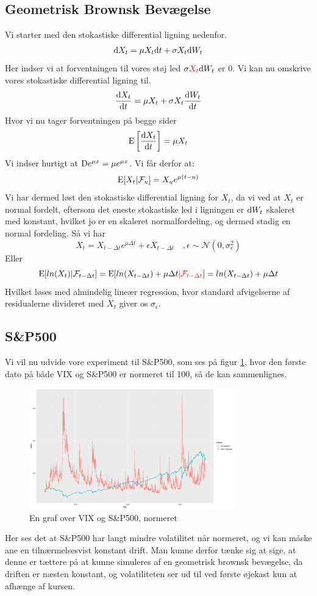 \documentclass{article}
\theoremstyle{definition}
\theoremstyle{remark}
\begin{document}
\subsection{Geometrisk Brownsk Bevægelse}
Vi starter med den stokastiske differential ligning nedenfor.
$$\text d X_t =  \mu X_t\text dt+\sigma X_t \text dW_t$$
Her indser vi at forventningen til vores støj led $\sigma \color{red}X_t\color{black}\text d W_t$ er 0. Vi kan nu omskrive vores stokastiske differential ligning til.
$$\frac{\text d X_t}{\text dt} =  \mu X_t+\sigma X_t \frac{\text dW_t}{\text dt}$$
Hvor vi nu tager forventningen på begge sider
$$\text E\left[\frac{\text d X_t}{\text dt}\right] =  \mu X_t$$
Vi indser hurtigt at $\text De^{\mu x}=\mu e^{\mu x}$. Vi får derfor at:
$$\text E[X_t|\mathcal F_u]=X_ue^{\mu (t-u)}$$
Vi har dermed løst den stokastiske differential ligning for $X_t$, da vi ved at $X_t$ er normal fordelt, eftersom det eneste stokastiske led i ligningen er $\text d W_t$ skaleret med konstant, hvilket jo er en skaleret normalfordeling, og dermed stadig en normal fordeling. Så vi har
$$X_t = X_{t-\Delta t}e^{\mu \Delta t}+\epsilon X_{t-\Delta t}\quad,\epsilon\sim\mathcal N(0,\sigma_\epsilon^2)$$
Eller
$$\text E[ln(X_t)|\mathcal F_{t-\Delta t}]=\text E[ln(X_{t-\Delta t})+\mu \Delta t\color{red}|\mathcal F_{t-\Delta t}\color{black}]=ln(X_{t-\Delta t})+\mu \Delta t $$
Hvilket løses med almindelig lineær regression, hvor standard afvigelserne af residualerne divideret med $X_t$ giver os $\sigma_\epsilon$.
\subsection{S\&P500}
Vi vil nu udvide vore experiment til S\&P500, som ses på figur \ref{fig:VIXSP500}, hvor den første dato på både VIX og S\&P500 er normeret til 100, så de kan sammenlignes.
\begin{figure}
    \centering
    \includegraphics[width=3.5in]{SP500_vs_VIX.png}
    \caption{En graf over VIX og S\&P500, normeret}
    \label{fig:VIXSP500}
\end{figure}
Her ses det at S\&P500 har langt mindre volatilitet når normeret, og vi kan måske ane en tilnærmelsesvist konstant drift. Man kunne derfor tænke sig at sige, at denne er tættere på at kunne simuleres af en geometrisk brownsk bevægelse, da driften er næsten konstant, og volatiliteten ser ud til ved første øjekast kun at afhænge af kursen.
\end{document}

